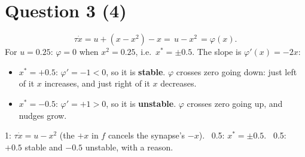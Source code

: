 \documentclass[11pt,letterpaper]{article}
\newcommand{\ans}[1]{\par\vspace{4pt}{\bfseries #1}\quad}
\begin{document}
\section*{Question 3 \hfill (4)}

\ans{(a) [2]}
\[
\tau\dot x = u + (x - x^2) - x = \boxed{\,u - x^2\,} = \varphi(x).
\]
For $u = 0.25$: $\varphi = 0$ when $x^2 = 0.25$, i.e.\ $x^* = \pm 0.5$. The slope is $\varphi'(x) = -2x$:
\begin{itemize}[leftmargin=1.2em]
\item $x^* = +0.5$: $\varphi' = -1 < 0$, so it is \textbf{stable}. $\varphi$ crosses zero going down: just left of it $x$ increases, and just right of it $x$ decreases.
\item $x^* = -0.5$: $\varphi' = +1 > 0$, so it is \textbf{unstable}. $\varphi$ crosses zero going up, and nudges grow.
\end{itemize}
\begin{marking}
1: $\tau\dot x = u - x^2$ (the $+x$ in $f$ cancels the synapse's $-x$). \ 0.5: $x^* = \pm 0.5$. \ 0.5: $+0.5$ stable and $-0.5$ unstable, with a reason.
\end{marking}
\end{document}
